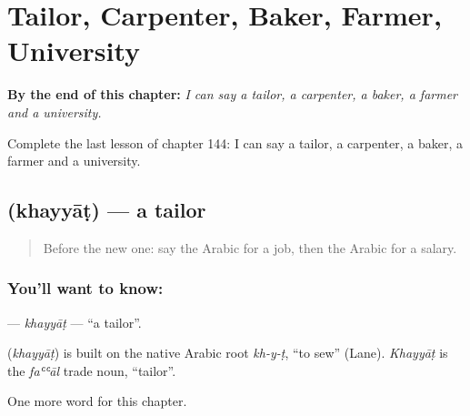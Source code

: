
\chapter{Tailor, Carpenter, Baker, Farmer, University}
\label{ch:ar-tailor-carpenter-baker-farmer-university}

\begin{chapteropening}
\textbf{By the end of this chapter:} \emph{I can say a tailor, a carpenter, a baker, a farmer and a university.}

Complete the last lesson of chapter 144: I can say a tailor, a carpenter, a baker, a farmer and a university.
\end{chapteropening}

\section[\texorpdfstring{\ar{خياط} (khayyāṭ)}{خياط (khayyāṭ)}]{ (khayyāṭ) — a tailor}

\label{lesson:AR-C144-khayyat}



\begin{quote}
Before the new one: say the Arabic for a job, then the Arabic for a salary.
\end{quote}

\subsection*{You'll want to know: }
\textbf{} — \emph{khayyāṭ} — \textquotedblleft{}a tailor\textquotedblright{}.

\begin{cousinweb}
\textbf{} (\emph{khayyāṭ}) is built on the native Arabic root \emph{kh-y-ṭ}, \textquotedblleft{}to sew\textquotedblright{} (Lane). \emph{Khayyāṭ} is the \emph{faʿʿāl} trade noun, \textquotedblleft{}tailor\textquotedblright{}.
\end{cousinweb}

\begin{grammarlens}[title={What you've built}]
One more word for this chapter.
\end{grammarlens}

